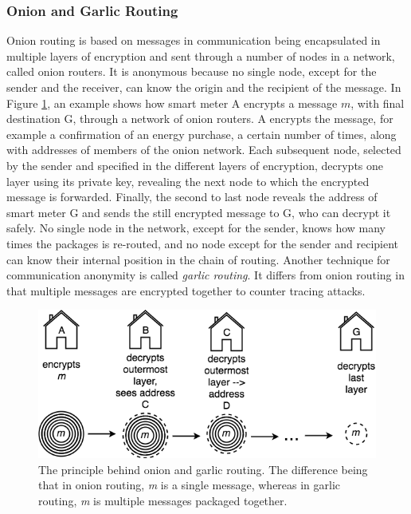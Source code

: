 \subsubsection{Onion and Garlic Routing}
Onion routing is based on messages in communication being encapsulated in multiple layers of encryption and sent through a number of nodes in a network, called onion routers. It is anonymous because no single node, except for the sender and the receiver, can know the origin and the recipient of the message. In Figure \ref{fig:garlicrouting}, an example shows how smart meter A encrypts a message $m$, with final destination G, through a network of onion routers. A encrypts the message, for example a confirmation of an energy purchase, a certain number of times, along with addresses of members of the onion network. Each subsequent node, selected by the sender and specified in the different layers of encryption, decrypts one layer using its private key, revealing the next node to which the encrypted message is forwarded. Finally, the second to last node reveals the address of smart meter G and sends the still encrypted message to G, who can decrypt it safely. No single node in the network, except for the sender, knows how many times the packages is re-routed, and no node except for the sender and recipient can know their internal position in the chain of routing. Another technique for communication anonymity is called \textit{garlic routing}. It differs from onion routing in that multiple messages are encrypted together to counter tracing attacks.

\begin{figure}
\centering
\includegraphics[width=\columnwidth]{garlicrouting.png}
\caption{The principle behind onion and garlic routing. The difference being that in onion routing, \textit{m} is a single message, whereas in garlic routing, \textit{m} is multiple messages packaged together.}\label{fig:garlicrouting}
\end{figure}

